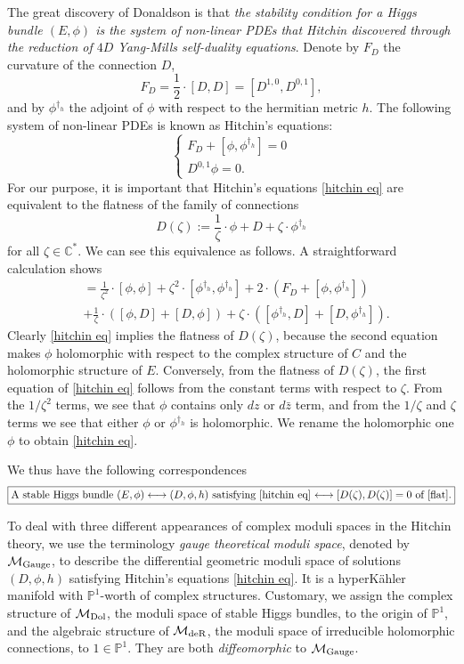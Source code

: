 \documentclass[oneside, 11pt]{amsart}
\theoremstyle{definition}
\numberwithin{equation}{subsection}
\def\Dol{{\text{\rm{Dol}}}}
\def\deR{{\text{\rm{deR}}}}
\def\Gauge{{\text{\rm{Gauge}}}}
\newcommand{\be}{\begin{equation}}
\newcommand{\ee}{\end{equation}}
\newcommand{\bP}{{\mathbb{P}}}
\newcommand{\cM}{{\mathcal{M}}}
\newcommand{\half}{{\frac{1}{2}}}
\begin{document}
The great discovery of Donaldson \cite{D} is that
\emph{the stability condition for a Higgs bundle
$(E,\phi)$ is the system of non-linear PDEs that
Hitchin discovered through the reduction of
$4D$ Yang-Mills self-duality equations}. 
Denote by $F_D$  the curvature of the connection $D$, 
$$F_D=\half \cdot [D,D]=[D^{1,0}, D^{0,1}],
$$
and by  $\phi^{\dagger_h}$  the adjoint of $\phi$ with respect to the hermitian metric $h$.
The following system of  non-linear  PDEs is 
known as Hitchin's equations:
\be
\begin{cases}\label{hitchin eq}
 F_D + [\phi, \phi^{\dagger_h}] = 0 \\
 D^{0,1} \phi = 0.
\end{cases}
\ee
For our purpose, it is 
 important  that Hitchin's equations \eqref{hitchin eq} are equivalent to the flatness of the family of connections
\begin{equation}\label{flat}
D(\zeta):=\frac{1}{\zeta} \cdot \phi+D+\zeta \cdot \phi^{\dagger_h}
\end{equation}
for all $\zeta\in \mathbb{C}^{*}$. 
We can see this equivalence as follows. 
A straightforward calculation shows
\begin{align*}
[D(\zeta), D(\zeta)]&=\frac{1}{\zeta^2} \cdot [\phi, \phi]+\zeta^2\cdot[\phi^{\dagger_h}, \phi^{\dagger_h}]+2 \cdot (F_{D}+[\phi, \phi^{\dagger_h}])\\
&+\frac{1}{\zeta}\cdot
\left( [\phi, D]+[D, \phi]\right)+\zeta \cdot
\left( [\phi^{\dagger_h}, D]+ [D, \phi^{\dagger_h}]\right).
\end{align*}
Clearly \eqref{hitchin eq} implies the flatness of
$D(\zeta)$, because the second equation makes
$\phi$ holomorphic with respect to the 
complex structure of $C$ and the holomorphic
structure of $E$. Conversely, from the 
flatness of $D(\zeta)$, the first equation 
of  \eqref{hitchin eq} follows from the constant 
terms with respect to $\zeta$. 
From the $1/\zeta^2$ terms, we see that $\phi$ 
contains only $dz$ or $d\bar{z}$ term,
and from the $1/\zeta$ and $\zeta$ terms we see that 
either  $\phi$ or $\phi^{\dagger_h}$ is holomorphic. 
We rename the holomorphic one $\phi$ to obtain
\eqref{hitchin eq}.



 We thus have the following correspondences
$$
\fbox{A stable Higgs bundle  $(E, \phi) \longleftrightarrow  (D, \phi, h)$  satisfying  \eqref{hitchin eq} $\longleftrightarrow  [D(\zeta), D(\zeta)]=0$  of  \eqref{flat}.}
$$


To deal with three different appearances of 
complex moduli spaces in the Hitchin theory, 
we use the 
terminology \textit{gauge theoretical moduli space},
denoted by $\mathcal{M}_{\Gauge}$,  
to describe the differential geometric
moduli space of 
solutions  $(D, \phi, h)$ satisfying Hitchin's equations \eqref{hitchin eq}. It is a hyperK\"ahler manifold with  $\mathbb{P}^1$-worth  of complex structures. 
Customary, we assign the complex structure of
$\cM_{\Dol}$,
the moduli space of stable Higgs bundles, 
to the origin of $\bP^1$, and the algebraic
structure of $\cM_{\deR}$, the moduli space of
irreducible holomorphic connections, to 
$1\in \bP^1$. They are both \emph{diffeomorphic}
to $\cM_{\Gauge}$. 
\end{document}
